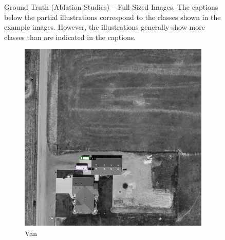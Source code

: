 \begin{figure}[h!]
    \caption[Ground Truth (Ablation Studies) – Full Sized Images]{Ground Truth (Ablation Studies) – Full Sized Images. The captions below the partial illustrations correspond to the classes shown in the example images. However, the illustrations generally show more classes than are indicated in the captions.}
    \label{fig:gt_ablation_examples_fs}
\end{figure}



\begin{figure}[h!]
    \centering
    \begin{subfigure}[t]{0.38\textwidth}
        \centering
        \includegraphics[width=\linewidth]{images/015Results/03ablation/comp_images/red/198.png}
        \caption{Van}
    \end{subfigure}
    \begin{subfigure}[t]{0.38\textwidth}
        \centering

\end{subfigure}
\end{figure}
